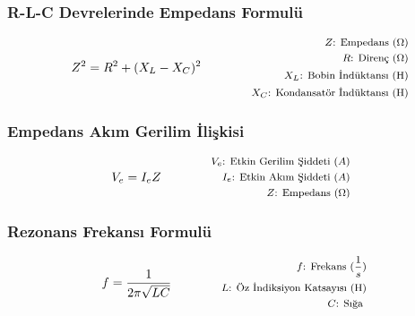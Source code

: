 \subsubsection*{R-L-C Devrelerinde Empedans Formulü}
\begin{equation}
    Z^2 = R^2 + (X_L - X_C)^2\qquad \qquad \parbox{4cm}{\footnotesize$\begin{aligned}
        Z\text{: Empedans } (\Omega) \\
        R\text{: Direnç } (\Omega) \\
        X_L\text{: Bobin İndüktansı (H)} \\
        X_C\text{: Kondansatör İndüktansı (H)}
\end{aligned}$}
\end{equation}

\subsubsection*{Empedans Akım Gerilim İlişkisi}
\begin{equation}
  V_e = I_eZ\qquad \qquad \parbox{4cm}{\footnotesize$\begin{aligned}
      V_e\text{: Etkin Gerilim Şiddeti } (A) \\
      I_e\text{: Etkin Akım Şiddeti } (A) \\
      Z\text{: Empedans } (\Omega)
\end{aligned}$}
\end{equation}

\subsubsection*{Rezonans Frekansı Formulü}
\begin{equation}
  f = \frac{1}{2 \pi \sqrt{LC}}\qquad \qquad \parbox{4cm}{\footnotesize$\begin{aligned}
      f\text{: Frekans } (\frac{1}{s}) \\
      L\text{: Öz İndiksiyon Katsayısı (H)} \\
      C\text{: Sığa }
\end{aligned}$}
\end{equation}
